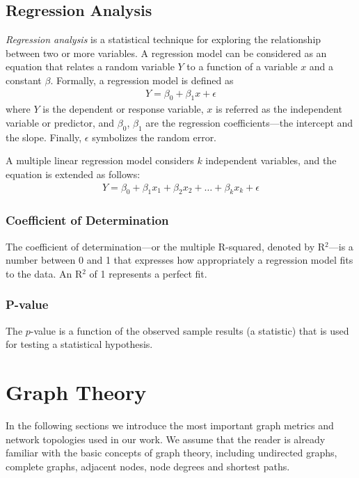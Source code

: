 \subsection{Regression Analysis}

\textit{Regression analysis} is a statistical technique for exploring the relationship between two or more variables. A regression model can be considered as an equation that relates a random variable $Y$ to a function of a variable $x$ and a constant $\beta$. Formally, a regression model is defined as
\begin{align} \label{eq:linear_regression}
	Y = \beta_0 + \beta_1x + \epsilon
\end{align}
where $Y$ is the dependent or response variable, $x$ is referred as the independent variable or predictor, and $\beta_0$, $\beta_1$ are the regression coefficients---the intercept and the slope. Finally, $\epsilon$ symbolizes the random error.

A multiple linear regression model considers $k$ independent variables, and the equation is extended as follows:
\begin{align}
	Y = \beta_0 + \beta_1x_1 + \beta_2x_2 + \dots + \beta_kx_k + \epsilon
\end{align}

\subsubsection{Coefficient of Determination}
The coefficient of determination---or the multiple R-squared, denoted by R$^2$---is a number between 0 and 1 that expresses how appropriately a regression model fits to the data. An R$^2$ of 1 represents a perfect fit.

\subsubsection{P-value}

The $p$-value is a function of the observed sample results (a statistic) that is used for testing a statistical hypothesis. 

\section{Graph Theory}

In the following sections we introduce the most important graph metrics and network topologies used in our work. We assume that the reader is already familiar with the basic concepts of graph theory, including undirected graphs, complete graphs, adjacent nodes,
node degrees and shortest paths.
